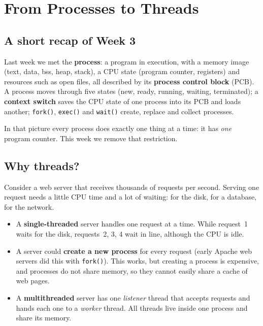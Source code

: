 \documentclass[11pt,a4paper]{article}
\newcommand{\term}[1]{\textbf{\color{mintdeep}#1}}
\newcommand{\cmd}[1]{\texttt{#1}}
\begin{document}
\setcounter{tocdepth}{2}
\tableofcontents

\section{From Processes to Threads}

\subsection{A short recap of Week 3}

Last week we met the \term{process}: a program in execution, with a memory image (text, data, bss, heap, stack), a CPU state (program counter, registers) and resources such as open files, all described by its \term{process control block} (PCB). A process moves through five states (new, ready, running, waiting, terminated); a \term{context switch} saves the CPU state of one process into its PCB and loads another; \cmd{fork()}, \cmd{exec()} and \cmd{wait()} create, replace and collect processes.

In that picture every process does exactly one thing at a time: it has \emph{one} program counter. This week we remove that restriction.

\subsection{Why threads?}

Consider a web server that receives thousands of requests per second. Serving one request needs a little CPU time and a lot of waiting: for the disk, for a database, for the network.

\begin{itemize}
  \item A \textbf{single-threaded} server handles one request at a time. While request~1 waits for the disk, requests~2, 3, 4 wait in line, although the CPU is idle.
  \item A server could \textbf{create a new process} for every request (early Apache web servers did this with \cmd{fork()}). This works, but creating a process is expensive, and processes do not share memory, so they cannot easily share a cache of web pages.
  \item A \textbf{multithreaded} server has one \emph{listener} thread that accepts requests and hands each one to a \emph{worker} thread. All threads live inside one process and share its memory.
\end{itemize}
\end{document}
